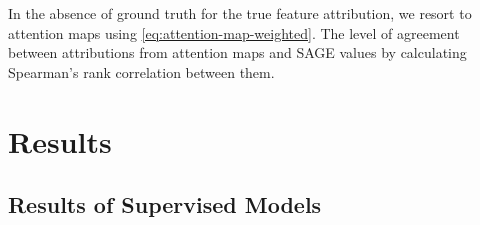 In the absence of ground truth for the true feature attribution, we resort to attention maps using \cref{eq:attention-map-weighted}. The level of agreement between attributions from attention maps and \gls{SAGE} values by calculating Spearman's rank correlation between them.

\newpage
\section{Results}\label{sec:results}

\subsection{Results of Supervised
    Models}\label{sec:results-of-supervised-models}

